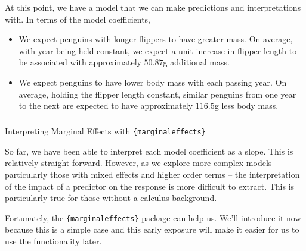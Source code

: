 \documentclass[
  letterpaper,
  DIV=11,
  numbers=noendperiod]{scrartcl}
\makeatletter
\let\oldsubparagraph\subparagraph
\renewcommand{\subparagraph}{
    \@ifstar
      \xxxSubParagraphStar
      \xxxSubParagraphNoStar
  }
\newcommand{\xxxSubParagraphStar}[1]{\oldsubparagraph*{#1}\mbox{}}
\newcommand{\xxxSubParagraphNoStar}[1]{\oldsubparagraph{#1}\mbox{}}
\providecommand{\tightlist}{%
  \setlength{\itemsep}{0pt}\setlength{\parskip}{0pt}}\usepackage{longtable,booktabs,array}
\makeatother
\begin{document}
At this point, we have a model that we can make predictions and
interpretations with. In terms of the model coefficients,

\begin{itemize}
\tightlist
\item
  We expect penguins with longer flippers to have greater mass. On
  average, with year being held constant, we expect a unit increase in
  flipper length to be associated with approximately \(50.87\)g
  additional mass.
\item
  We expect penguins to have lower body mass with each passing year. On
  average, holding the flipper length constant, similar penguins from
  one year to the next are expected to have approximately \(116.5\)g
  less body mass.
\end{itemize}

\subparagraph{\texorpdfstring{Interpreting Marginal Effects with
\texttt{\{marginaleffects\}}}{Interpreting Marginal Effects with \{marginaleffects\}}}\label{interpreting-marginal-effects-with-marginaleffects}

So far, we have been able to interpret each model coefficient as a
slope. This is relatively straight forward. However, as we explore more
complex models -- particularly those with mixed effects and higher order
terms -- the interpretation of the impact of a predictor on the response
is more difficult to extract. This is particularly true for those
without a calculus background.

Fortunately, the \texttt{\{marginaleffects\}} package can help us. We'll
introduce it now because this is a simple case and this early exposure
will make it easier for us to use the functionality later.
\end{document}

